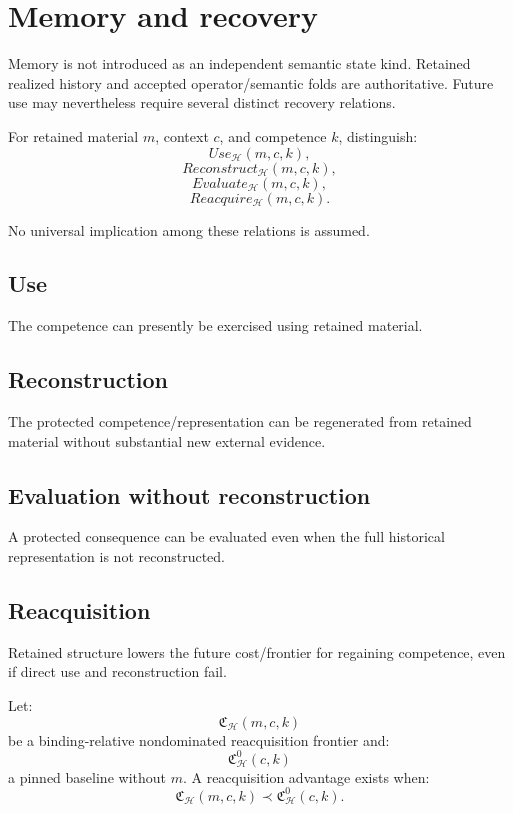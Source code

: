 \documentclass[11pt,oneside]{article}
\begin{document}
\section{Memory and recovery}

Memory is not introduced as an independent semantic state kind.  Retained realized history and accepted operator/semantic folds are authoritative.  Future use may nevertheless require several distinct recovery relations.

For retained material \(m\), context \(c\), and competence \(k\), distinguish:
\[
Use_{\mathcal H}(m,c,k),
\]
\[
Reconstruct_{\mathcal H}(m,c,k),
\]
\[
Evaluate_{\mathcal H}(m,c,k),
\]
\[
Reacquire_{\mathcal H}(m,c,k).
\]

No universal implication among these relations is assumed.

\subsection{Use}

The competence can presently be exercised using retained material.

\subsection{Reconstruction}

The protected competence/representation can be regenerated from retained material without substantial new external evidence.

\subsection{Evaluation without reconstruction}

A protected consequence can be evaluated even when the full historical representation is not reconstructed.

\subsection{Reacquisition}

Retained structure lowers the future cost/frontier for regaining competence, even if direct use and reconstruction fail.

Let:
\[
\mathfrak C_{\mathcal H}(m,c,k)
\]
be a binding-relative nondominated reacquisition frontier and:
\[
\mathfrak C^0_{\mathcal H}(c,k)
\]
a pinned baseline without \(m\).  A reacquisition advantage exists when:
\[
\boxed{
\mathfrak C_{\mathcal H}(m,c,k)
\prec
\mathfrak C^0_{\mathcal H}(c,k).
}
\]
\end{document}
